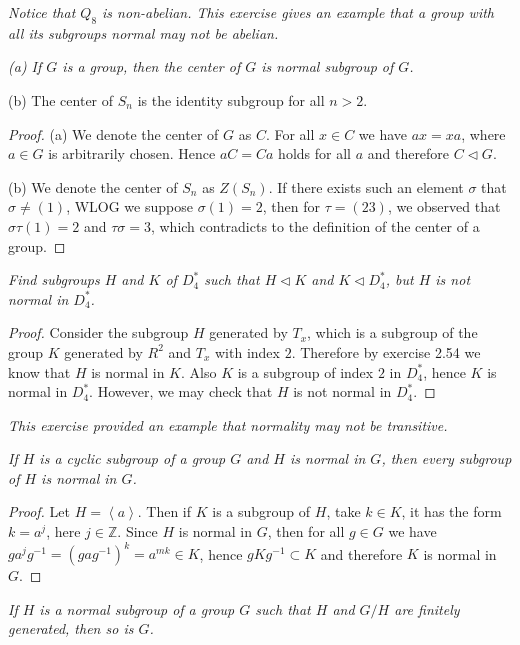 \begin{note}\em
Notice that $Q_8$ is non-abelian. This exercise gives an example that a group with all its subgroups normal may not be abelian.
\end{note}
\begin{problem}\em
(a) If $G$ is a group, then the center of $G$ is normal subgroup of $G$.\par
(b) The center of $S_n$ is the identity subgroup for all $n>2$.
\end{problem}
\begin{proof}
(a) We denote the center of $G$ as $C$. For all $x\in C$ we have $ax=xa$, where $a\in G$ is arbitrarily chosen. Hence $aC=Ca$ holds for all $a$ and therefore $C\lhd G$.\par
(b) We denote the center of $S_n$ as $Z(S_n)$. If there exists such an element $\sigma$ that $\sigma\ne(1)$, WLOG we suppose $\sigma(1)=2$, then for $\tau=(23)$, we observed that $\sigma\tau(1)=2$ and $\tau\sigma=3$, which contradicts to the definition of the center of a group.
\end{proof}
\begin{problem}\em
Find subgroups $H$ and $K$ of $D_4^*$ such that $H\lhd K$ and $K\lhd D_4^*$, but $H$ is not normal in $D_4^*$.
\end{problem}
\begin{proof}
Consider the subgroup $H$ generated by $T_x$, which is a subgroup of the group $K$ generated by $R^2$ and $T_x$ with index $2$. Therefore by exercise 2.54 we know that $H$ is normal in $K$. Also $K$ is a subgroup of index $2$ in $D_4^*$, hence $K$ is normal in $D_4^*$. However, we may check that $H$ is not normal in $D_4^*$.
\end{proof}
\begin{note}\em
This exercise provided an example that normality may not be transitive.
\end{note}
\begin{problem}\em
If $H$ is a cyclic subgroup of a group $G$ and $H$ is normal in $G$, then every subgroup of $H$ is normal in $G$.
\end{problem}
\begin{proof}
Let $H=\left<a\right>$. Then if $K$ is a subgroup of $H$, take $k\in K$, it has the form $k=a^j$, here $j\in\mathbb{Z}$. Since $H$ is normal in $G$, then for all $g\in G$ we have $ga^jg^{-1}=(gag^{-1})^k=a^{mk}\in K$, hence $gKg^{-1}\subset K$ and therefore $K$ is normal in $G$.
\end{proof}
\begin{problem}\em
If $H$ is a normal subgroup of a group $G$ such that $H$ and $G/H$ are finitely generated, then so is $G$.
\end{problem}
